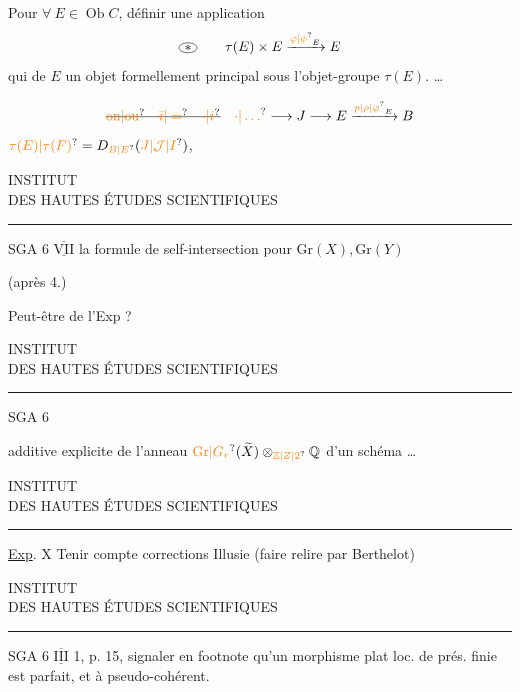 Pour $\forall\ E\in\operatorname{Ob}C$,  définir une application
\[
 \tikz[baseline=(a.base)]{\node(a) at (0,0){$*$};\draw (0,0) ellipse (.65em and .36em);}\qquad
 \tau(E)\times E\xrightarrow{{\unsure{\varphi|\phi}}_{E}}E
\]
qui  de $E$ un objet formellement principal sous l'objet-groupe $\tau(E)$.    \ldots

\[
 \deleted{\text{\unsure{on|ou}}\quad\unsure{\bar{\imath}|=}\quad\unsure{\cdot|i}}\quad
 \unsure{\cdot|\ldots}\longrightarrow{J}\longrightarrow E\xrightarrow{{\unsure{p|\rho|\varphi}}_{E}}B
\]
 $\unsure{\tau(E)|\tau(F)}=D_{\unsure{B|E}}(\unsure{J|\mathcal{J}|I})$,
\begin{center}
INSTITUT\\
DES HAUTES ÉTUDES SCIENTIFIQUES\\[-.4ex]
\rule{1.4cm}{.4pt}
\end{center}

SGA 6 $\overline{\underline{\mathrm{VII}}}$ \qquad {} la formule de self-intersection pour $\mathrm{Gr}(X),\mathrm{Gr}(Y)$

(après 4.)

Peut-être  de l'Exp ?
\begin{center}
INSTITUT\\
DES HAUTES ÉTUDES SCIENTIFIQUES\\[-.4ex]
\rule{1.4cm}{.4pt}
\end{center}

SGA 6

 additive explicite de l'anneau $\unsure{\mathrm{Gr}|G_{r}}(\widetilde X)\otimes_{\unsure{\mathbb Z|Z|2}}\mathbb Q$ d'un schéma \ldots
\begin{center}
INSTITUT\\
DES HAUTES ÉTUDES SCIENTIFIQUES\\[-.4ex]
\rule{1.4cm}{.4pt}
\end{center}

\uline{Exp}. X \qquad Tenir compte corrections  Illusie (faire relire par Berthelot)
\begin{center}
INSTITUT\\
DES HAUTES ÉTUDES SCIENTIFIQUES\\[-.4ex]
\rule{1.4cm}{.4pt}
\end{center}

SGA 6 $\overline{\underline{\mathrm{III}}}$ 1, p. 15, signaler en footnote qu'un morphisme plat loc. de prés. finie est parfait, et à  pseudo-cohérent.

